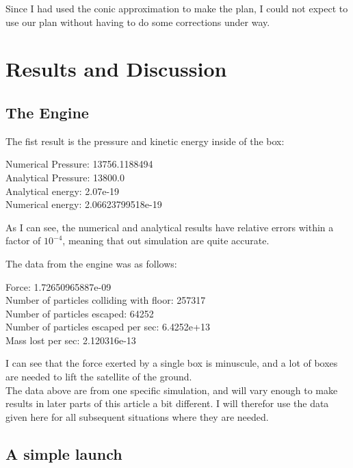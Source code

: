 \documentclass[a4paper, 10pt]{article}
\begin{document}
Since I had used the conic approximation to make the plan, I could not expect to use our plan without having to do some corrections under way. 




\section{Results and Discussion}

\subsection{The Engine}

The fist result is the pressure and kinetic energy inside of the box:
\begin{tcolorbox}
Numerical Pressure:  13756.1188494 \\
Analytical Pressure:  13800.0 \\
Analytical energy:  2.07e-19 \\
Numerical energy:  2.06623799518e-19 
\end{tcolorbox}

As I can see, the numerical and analytical results have relative errors within a factor of $10^{-4}$, meaning that out simulation are quite accurate.

The data from the engine was as follows:

\begin{tcolorbox}
Force:  1.72650965887e-09 \\
Number of particles colliding with floor:  257317 \\
Number of particles escaped:  64252 \\
Number of particles escaped per sec:  6.4252e+13 \\
Mass lost per sec:  2.120316e-13
\end{tcolorbox}

I can see that the force exerted by a single box is minuscule, and a lot of boxes are needed to lift the satellite of the ground. \\

The data above are from one specific simulation, and will vary enough to make results in later parts of this article a bit different. I will therefor use the data given here for all subsequent situations where they are needed.

\subsection{A simple launch}
\end{document}
